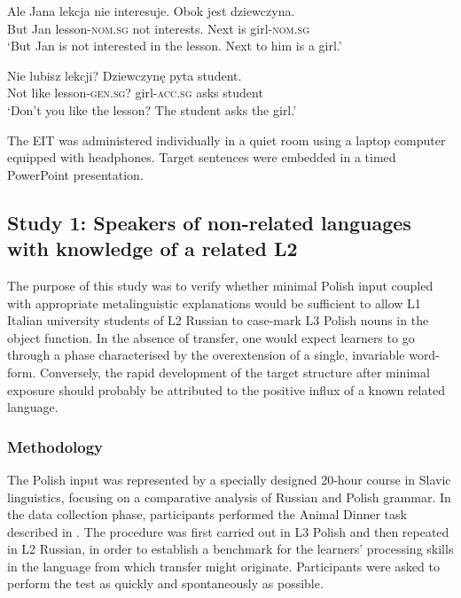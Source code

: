 \documentclass[output=paper,            colorlinks, citecolor=brown            		  ]{langscibook}
\begin{document}
    \ex\label{ex:saturno:19b} 
    \gll Ale  Jana  lekcja      nie  interesuje.  Obok  jest dziewczyna.\\
    But  Jan  lesson-\textsc{nom.sg}  not  interests.  Next  is    girl-\textsc{nom.sg}\\
    \glt ‘But Jan is not interested in the lesson. Next to him is a girl.’

    \ex\label{ex:saturno:19c}
    \gll Nie  lubisz  lekcji?      Dziewczynę  pyta  student.\\
    Not  like  lesson-\textsc{gen.sg}?  girl-\textsc{acc.sg}  asks  student\\
    \glt ‘Don’t you like the lesson? The student asks the girl.’
    \z
\z

The EIT was administered individually in a quiet room using a laptop computer equipped with headphones. Target sentences were embedded in a timed PowerPoint presentation.

\subsection{Study 1: Speakers of non-related languages with knowledge of a related L2 \citep{Saturno2020b}}
\label{sec:saturno:3.2}
The purpose of this study was to verify whether minimal Polish input coupled with appropriate metalinguistic explanations would be sufficient to allow L1 Italian university students of L2 Russian to case-mark L3 Polish nouns in the object function. In the absence of transfer, one would expect learners to go through a phase characterised by the overextension of a single, invariable word-form. Conversely, the rapid development of the target structure after minimal exposure should probably be attributed to the positive influx of a known related language.

\subsubsection{Methodology}\label{sec:saturno:3.2.1}

The Polish input was represented by a specially designed 20-hour course in Slavic linguistics, focusing on a comparative analysis of Russian and Polish grammar. In the data collection phase, participants performed the Animal Dinner task described in . The procedure was first carried out in L3 Polish and then repeated in L2 Russian, in order to establish a benchmark for the learners’ processing skills in the language from which transfer might originate. Participants were asked to perform the test as quickly and spontaneously as possible. 
\end{document}
